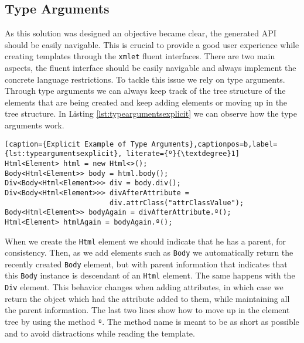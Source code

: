 \subsection{Type Arguments}
\label{sec:typearguments}

As this solution was designed an objective became clear, the generated \ac{API} should be easily navigable. This is crucial to provide a good user experience while creating templates through the \texttt{xmlet} fluent interfaces. There are two main aspects, the fluent interface should be easily navigable and always implement the concrete language restrictions. To tackle this issue we rely on type arguments. Through type arguments we can always keep track of the tree structure of the elements that are being created and keep adding elements or moving up in the tree structure. In Listing \ref{lst:typeargumentsexplicit} we can observe how the type arguments work. 

\bigskip


\begin{minipage}{\linewidth}
\begin{lstlisting}[caption={Explicit Example of Type Arguments},captionpos=b,label={lst:typeargumentsexplicit}, literate={º}{\textdegree}1]
Html<Element> html = new Html<>();
Body<Html<Element>> body = html.body();
Div<Body<Html<Element>>> div = body.div();
Div<Body<Html<Element>>> divAfterAttribute = 
                         div.attrClass("attrClassValue");
Body<Html<Element>> bodyAgain = divAfterAttribute.º();
Html<Element> htmlAgain = bodyAgain.º();
\end{lstlisting}
\end{minipage}

\noindent
When we create the \texttt{Html} element we should indicate that he has a parent, for consistency. Then, as we add elements such as \texttt{Body} we automatically return the recently created \texttt{Body} element, but with parent information that indicates that this \texttt{Body} instance is descendant of an \texttt{Html} element. The same happens with the \texttt{Div} element. This behavior changes when adding attributes, in which case we return the object which had the attribute added to them, while maintaining all the parent information. The last two lines show how to move up in the element tree by using the method \texttt{º}. The method name is meant to be as short as possible and to avoid distractions while reading the template. 

